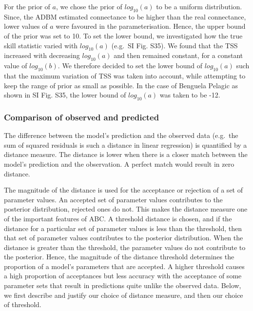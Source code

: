 \documentclass{article}
\begin{document}
For the prior of \(a\), we chose the prior of \(log_{10}(a)\) to be a
uniform distribution. Since, the ADBM estimated connectance to be higher
than the real connectance, lower values of \(a\) were favoured in the
parameterisation. Hence, the upper bound of the prior was set to 10. To
set the lower bound, we investigated how the true skill statistic varied
with \(log_{10}(a)\) (e.g.~SI Fig. S35). We found that the TSS increased
with decreasing \(log_{10}(a)\) and then remained constant, for a
constant value of \(log_{10}(b)\). We therefore decided to set the lower
bound of \(log_{10}(a)\) such that the maximum variation of TSS was
taken into account, while attempting to keep the range of prior as small
as possible. In the case of Benguela Pelagic as shown in SI Fig. S35,
the lower bound of \(log_{10}(a)\) was taken to be -12.

\hypertarget{comparison-of-observed-and-predicted}{%
\subsubsection{Comparison of observed and
predicted}\label{comparison-of-observed-and-predicted}}

The difference between the model's prediction and the observed data
(e.g.~the sum of squared residuals is such a distance in linear
regression) is quantified by a distance measure. The distance is lower
when there is a closer match between the model's prediction and the
observation. A perfect match would result in zero distance.

The magnitude of the distance is used for the acceptance or rejection of
a set of parameter values. An accepted set of parameter values
contributes to the posterior distribution, rejected ones do not. This
makes the distance measure one of the important features of ABC. A
threshold distance is chosen, and if the distance for a particular set
of parameter values is less than the threshold, then that set of
parameter values contributes to the posterior distribution. When the
distance is greater than the threshold, the parameter values do not
contribute to the posterior. Hence, the magnitude of the distance
threshold determines the proportion of a model's parameters that are
accepted. A higher threshold causes a high proportion of acceptances but
less accuracy with the acceptance of some parameter sets that result in
predictions quite unlike the observed data. Below, we first describe and
justify our choice of distance measure, and then our choice of
threshold.
\end{document}
